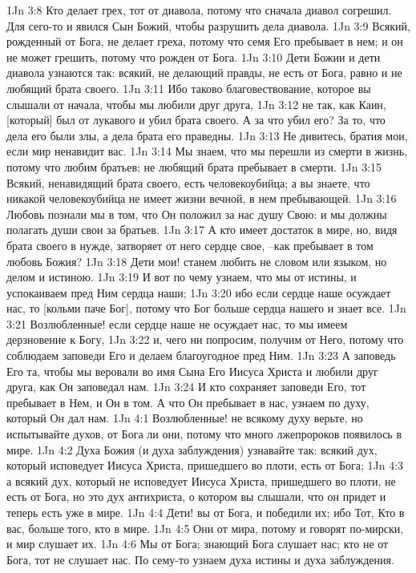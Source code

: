 1Jn 3:8  Кто делает грех, тот от диавола, потому что сначала диавол согрешил. Для сего-то и явился Сын Божий, чтобы разрушить дела диавола.
1Jn 3:9  Всякий, рожденный от Бога, не делает греха, потому что семя Его пребывает в нем; и он не может грешить, потому что рожден от Бога.
1Jn 3:10  Дети Божии и дети диавола узнаются так: всякий, не делающий правды, не есть от Бога, равно и не любящий брата своего.
1Jn 3:11  Ибо таково благовествование, которое вы слышали от начала, чтобы мы любили друг друга,
1Jn 3:12  не так, как Каин, [который] был от лукавого и убил брата своего. А за что убил его? За то, что дела его были злы, а дела брата его праведны.
1Jn 3:13  Не дивитесь, братия мои, если мир ненавидит вас.
1Jn 3:14  Мы знаем, что мы перешли из смерти в жизнь, потому что любим братьев; не любящий брата пребывает в смерти.
1Jn 3:15  Всякий, ненавидящий брата своего, есть человекоубийца; а вы знаете, что никакой человекоубийца не имеет жизни вечной, в нем пребывающей.
1Jn 3:16  Любовь познали мы в том, что Он положил за нас душу Свою: и мы должны полагать души свои за братьев.
1Jn 3:17  А кто имеет достаток в мире, но, видя брата своего в нужде, затворяет от него сердце свое, --как пребывает в том любовь Божия?
1Jn 3:18  Дети мои! станем любить не словом или языком, но делом и истиною.
1Jn 3:19  И вот по чему узнаем, что мы от истины, и успокаиваем пред Ним сердца наши;
1Jn 3:20  ибо если сердце наше осуждает нас, то [кольми паче Бог], потому что Бог больше сердца нашего и знает все.
1Jn 3:21  Возлюбленные! если сердце наше не осуждает нас, то мы имеем дерзновение к Богу,
1Jn 3:22  и, чего ни попросим, получим от Него, потому что соблюдаем заповеди Его и делаем благоугодное пред Ним.
1Jn 3:23  А заповедь Его та, чтобы мы веровали во имя Сына Его Иисуса Христа и любили друг друга, как Он заповедал нам.
1Jn 3:24  И кто сохраняет заповеди Его, тот пребывает в Нем, и Он в том. А что Он пребывает в нас, узнаем по духу, который Он дал нам.
1Jn 4:1  Возлюбленные! не всякому духу верьте, но испытывайте духов, от Бога ли они, потому что много лжепророков появилось в мире.
1Jn 4:2  Духа Божия (и духа заблуждения) узнавайте так: всякий дух, который исповедует Иисуса Христа, пришедшего во плоти, есть от Бога;
1Jn 4:3  а всякий дух, который не исповедует Иисуса Христа, пришедшего во плоти, не есть от Бога, но это дух антихриста, о котором вы слышали, что он придет и теперь есть уже в мире.
1Jn 4:4  Дети! вы от Бога, и победили их; ибо Тот, Кто в вас, больше того, кто в мире.
1Jn 4:5  Они от мира, потому и говорят по-мирски, и мир слушает их.
1Jn 4:6  Мы от Бога; знающий Бога слушает нас; кто не от Бога, тот не слушает нас. По сему-то узнаем духа истины и духа заблуждения.
